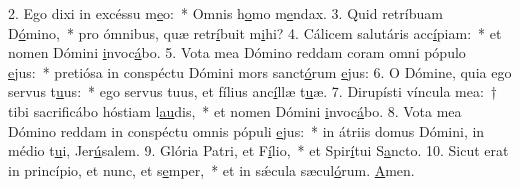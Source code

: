 2. Ego dixi in excéssu m\uline{e}o:~* Omnis h\uline{o}mo m\uline{e}ndax.
3. Quid retríbuam D\uline{ó}mino,~* pro ómnibus, quæ retr\uline{í}buit m\uline{i}hi?
4. Cálicem salutáris acc\uline{í}piam:~* et nomen Dómini \uline{i}nvoc\uline{á}bo.
5. Vota mea Dómino reddam coram omni pópulo \uline{e}jus:~* pretiósa in conspéctu Dómini mors sanct\uline{ó}rum \uline{e}jus:
6. O Dómine, quia ego servus t\uline{u}us:~* ego servus tuus, et fílius anc\uline{í}llæ t\uline{u}æ.
7. Dirupísti víncula mea:~† tibi sacrificábo hóstiam l\uline{au}dis,~* et nomen Dómini \uline{i}nvoc\uline{á}bo.
8. Vota mea Dómino reddam in conspéctu omnis pópuli \uline{e}jus:~* in átriis domus Dómini, in médio t\uline{u}i, Jer\uline{ú}salem.
9. Glória Patri, et F\uline{í}lio,~* et Spir\uline{í}tui S\uline{a}ncto.
10. Sicut erat in princípio, et nunc, et s\uline{e}mper,~* et in sǽcula sæcul\uline{ó}rum. \uline{A}men.
